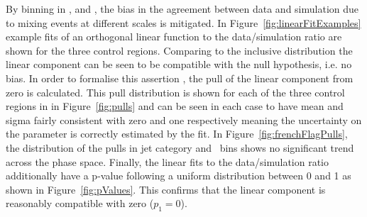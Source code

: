 By binning in \scalht, \njet and \nb, the bias in the agreement 
between data and simulation due to mixing events at different scales is mitigated. 
In Figure~\ref{fig:linearFitExamples} example fits of an orthogonal linear function to the data/simulation ratio 
are shown for the three control regions. Comparing to the inclusive distribution 
the linear component can be seen to be compatible with the null hypothesis, 
i.e. no bias. In order to formalise this assertion ,
the pull of the linear component from zero is calculated.
This pull distribution is shown for each of the three control regions in
in Figure~\ref{fig:pulls} and can be seen in each case to have mean and sigma fairly 
consistent with zero and one respectively meaning the uncertainty on the parameter is correctly estimated by the fit. 
In Figure~\ref{fig:frenchFlagPulls}, the distribution of the pulls 
in jet category and \scalht~bins shows no significant trend across the phase space.
Finally, the linear fits to the data/simulation ratio additionally have a p-value following 
a uniform distribution between 0 and 1 as shown in Figure~\ref{fig:pValues}.
This confirms that the linear component is reasonably compatible with zero ($p_1 = 0$). %


